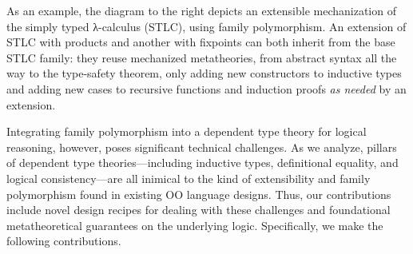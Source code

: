 As an example, the diagram to the right depicts an extensible
mechanization of the simply typed λ-calculus (STLC), using family
polymorphism.
An extension of STLC with products and another with fixpoints
can both inherit from the base STLC family:
they reuse mechanized metatheories,
from abstract syntax all the way to the type-safety theorem,
only adding new constructors to inductive types
and adding new cases to recursive functions and induction proofs
\emph{as needed} by an extension.

Integrating family polymorphism into a dependent type theory for
logical reasoning, however, poses significant technical challenges.
As we analyze, pillars of dependent type theories—including
inductive types, definitional equality, and logical consistency—are
all inimical to the kind of extensibility and family polymorphism
found in existing OO language designs.
Thus, our contributions include novel design recipes for dealing with
these challenges and foundational meta\-theoretical guarantees on the
underlying logic.
%
Specifically, we make the following contributions.

\endgroup

